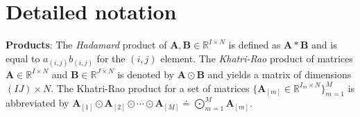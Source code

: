 \documentclass[runningheads]{llncs}
\newcommand{\realnum}{\mathbb{R}}
\providecommand{\matnot}[1]{_{[{#1}]}}
\begin{document}
 

\clearpage



\newpage
\appendix


\section{Detailed notation}
\label{sec:nosharing_notation_supplem}

\textbf{Products}: The \textit{Hadamard} product of $\bm{A}, \bm{B} \in \realnum^{I \times N}$ is defined as $\bm{A} * \bm{B}$ and is equal to ${a}_{(i, j)} {b}_{(i, j)}$ for the $(i, j)$ element. The \textit{Khatri-Rao} product of matrices $\bm{A} \in \realnum^{I \times N}$
and $\bm{B} \in \realnum^{J \times N}$ is
denoted by $\bm{A} \odot \bm{B}$ and yields a matrix of
dimensions $(IJ)\times N$.  The Khatri-Rao product for a set of matrices  $\{\bm{A}\matnot{m} \in \realnum^{I_m \times N} \}_{m=1}^M$ is abbreviated by $\bm{A}\matnot{1} \odot \bm{A}\matnot{2} \odot  \cdots \odot  \bm{A}\matnot{M} \doteq  \bigodot_{m=1}^M \bm{A}\matnot{m}$.
\end{document}
